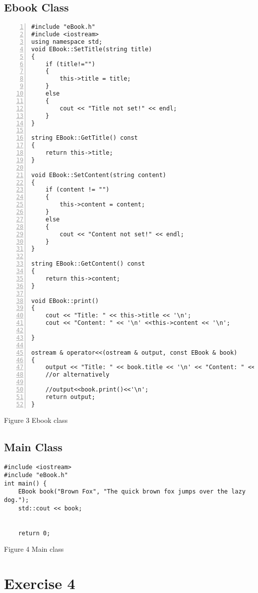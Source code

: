 \documentclass{llncs}
\begin{document}
\subsection{Ebook Class}
\begin{lstlisting}[basicstyle=\footnotesize\ttfamily, numbers=left, stepnumber=1, numberstyle = \normalsize]
#include "eBook.h"
#include <iostream>
using namespace std;
void EBook::SetTitle(string title)
{
	if (title!="")
	{
		this->title = title;
	}
	else
	{
		cout << "Title not set!" << endl;
	}
}

string EBook::GetTitle() const
{
	return this->title;
}

void EBook::SetContent(string content)
{
	if (content != "")
	{
		this->content = content;
	}
	else
	{
		cout << "Content not set!" << endl;
	}
}

string EBook::GetContent() const
{
	return this->content;
}

void EBook::print()
{
	cout << "Title: " << this->title << '\n';
	cout << "Content: " << '\n' <<this->content << '\n';

}

ostream & operator<<(ostream & output, const EBook & book)
{
	output << "Title: " << book.title << '\n' << "Content: " << book.content << '\n';
	//or alternatively 

	//output<<book.print()<<'\n';
	return output;
}
\end{lstlisting}
\footnotesize{Figure 3 Ebook class}\newline
\subsection{Main Class}

\begin{lstlisting}
#include <iostream>
#include "eBook.h"
int main() {
	EBook book("Brown Fox", "The quick brown fox jumps over the lazy dog.");
	std::cout << book; 


	return 0; 

\end{lstlisting}
\footnotesize{Figure 4 Main class}
\section{Exercise 4}
\end{document}
